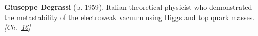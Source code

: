 \textbf{Giuseppe Degrassi} (b. 1959). Italian theoretical physicist who demonstrated the metastability of the electroweak vacuum using Higgs and top quark masses. \emph{[Ch.~\hyperref[ch:falsevacuumthreat]{16}]}

